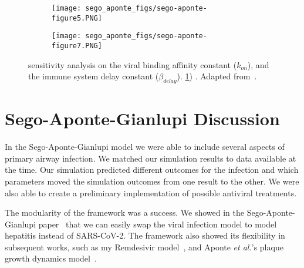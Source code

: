 \begin{figure}[H]
    \centering
    \begin{subfigure}{0.9\linewidth}
    \texttt{[image: sego\_aponte\_figs/sego-aponte-figure5.PNG]}
    \caption{}\label{fig:sego:kon-betadel:pop}
    \end{subfigure}
    \begin{subfigure}{0.9\linewidth}
    \texttt{[image: sego\_aponte\_figs/sego-aponte-figure7.PNG]}
    \caption{}\label{fig:sego:kon-betadel:vir}
    \end{subfigure}
    \caption{sensitivity analysis on the viral binding affinity constant ($k_{on}$), and the immune system delay constant ($\beta_{delay}$). \ref{fig:sego:kon-betadel:pop}) . Adapted from~\cite{sego_modular_2020}.}\label{fig:sego:kon-betadel}

\end{figure}


\section{Sego-Aponte-Gianlupi Discussion}\label{sec:sego-aponte:dis}

In the Sego-Aponte-Gianlupi model we were able to include several aspects of primary airway infection. We matched our simulation results to data available at the time. Our simulation predicted different outcomes for the infection and which parameters moved the simulation outcomes from one result to the other. We were also able to create a preliminary implementation of possible antiviral treatments.

The modularity of the framework was a success. We showed in the Sego-Aponte-Gianlupi paper~\cite{sego_modular_2020} that we can easily swap the viral infection model to model hepatitis instead of SARS-CoV-2. The framework also showed its flexibility in subsequent works, such as my Remdesivir model~\cite{ferrari_gianlupi_multiscale_2022}, and Aponte \textit{et al.}'s plaque growth dynamics model~\cite{aponte-serrano_multicellular_2021}.

